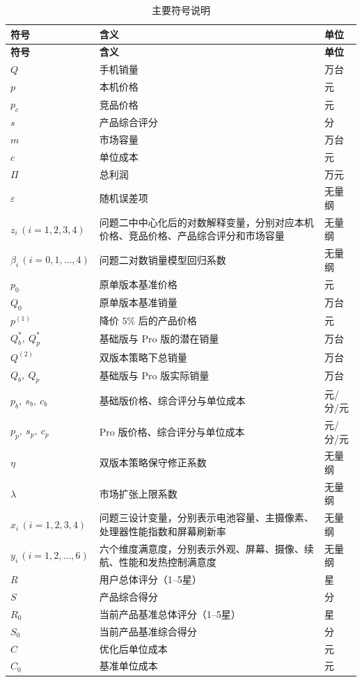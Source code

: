 \documentclass[withoutpreface,bwprint]{cumcmthesis} %
\begin{document}
\begin{longtable}{%
>{\centering\arraybackslash}m{2.3cm}
>{\raggedright\arraybackslash}p{9.2cm}
>{\centering\arraybackslash}m{2.2cm}}
\caption{主要符号说明}\label{tab:symbols}\\
\toprule
\rowcolor{headerblue}
\textbf{符号} & \textbf{含义} & \textbf{单位} \\
\midrule
\endfirsthead

\toprule
\rowcolor{headerblue}
\textbf{符号} & \textbf{含义} & \textbf{单位} \\
\midrule
\endhead

\bottomrule
\endfoot

$Q$ & 手机销量 & 万台 \\
$p$ & 本机价格 & 元 \\
$p_c$ & 竞品价格 & 元 \\
$s$ & 产品综合评分 & 分 \\
$m$ & 市场容量 & 万台 \\
$c$ & 单位成本 & 元 \\
$\Pi$ & 总利润 & 万元 \\
$\varepsilon$ & 随机误差项 & 无量纲 \\

$z_i\,(i=1,2,3,4)$ & 问题二中中心化后的对数解释变量，分别对应本机价格、竞品价格、产品综合评分和市场容量 & 无量纲 \\
$\beta_i\,(i=0,1,\dots,4)$ & 问题二对数销量模型回归系数 & 无量纲 \\

$p_0$ & 原单版本基准价格 & 元 \\
$Q_0$ & 原单版本基准销量 & 万台 \\
$p^{(1)}$ & 降价 $5\%$ 后的产品价格 & 元 \\
$Q_b^\ast,\ Q_p^\ast$ & 基础版与 Pro 版的潜在销量 & 万台 \\
$Q^{(2)}$ & 双版本策略下总销量 & 万台 \\
$Q_b,\ Q_p$ & 基础版与 Pro 版实际销量 & 万台 \\
$p_b,\ s_b,\ c_b$ & 基础版价格、综合评分与单位成本 & 元/分/元 \\
$p_p,\ s_p,\ c_p$ & Pro 版价格、综合评分与单位成本 & 元/分/元 \\
$\eta$ & 双版本策略保守修正系数 & 无量纲 \\
$\lambda$ & 市场扩张上限系数 & 无量纲 \\

$x_i\,(i=1,2,3,4)$ & 问题三设计变量，分别表示电池容量、主摄像素、处理器性能指数和屏幕刷新率 & 无量纲  \\
$y_i\,(i=1,2,\dots,6)$ & 六个维度满意度，分别表示外观、屏幕、摄像、续航、性能和发热控制满意度 & 无量纲 \\
$R$ & 用户总体评分（1--5星） & 星 \\
$S$ & 产品综合得分 & 分 \\
$R_0$ & 当前产品基准总体评分（1--5星） & 星 \\
$S_0$ & 当前产品基准综合得分 & 分 \\
$C$ & 优化后单位成本 & 元 \\
$C_0$ & 基准单位成本 & 元 \\


\end{longtable}
\end{document}
